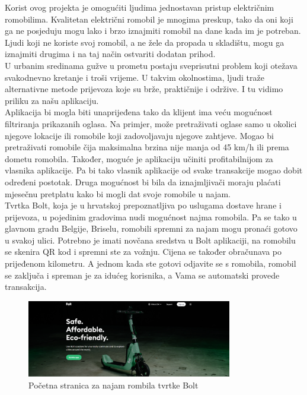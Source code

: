 		\indent Korist ovog projekta je omogućiti ljudima jednostavan pristup električnim romobilima. Kvalitetan električni romobil je mnogima preskup, tako da oni koji ga ne posjeduju mogu lako i brzo iznajmiti romobil na dane kada im je potreban. Ljudi koji ne koriste svoj romobil, a ne žele da propada u skladištu, mogu ga iznajmiti drugima i na taj način ostvariti dodatan prihod. \\
		\indent U urbanim sredinama gužve u prometu postaju sveprisutni problem koji otežava svakodnevno kretanje i troši vrijeme. U takvim okolnostima, ljudi traže alternativne metode prijevoza koje su brže, praktičnije i održive. I tu vidimo priliku za našu aplikaciju.\\
		
		\indent Aplikacija bi mogla biti unaprijeđena tako da klijent ima veću mogućnost filtriranja prikazanih oglasa. Na primjer, može pretraživati oglase samo u okolici njegove lokacije ili romobile koji zadovoljavaju njegove zahtjeve. Mogao bi pretraživati romobile čija maksimalna brzina nije manja od 45 km/h ili prema dometu romobila. Također, moguće je aplikaciju učiniti profitabilnijom za vlasnika aplikacije.
		Pa bi tako vlasnik aplikacije od svake transakcije mogao dobit određeni postotak. Druga mogućnost bi bila da iznajmljivači moraju plaćati mjesečnu pretplatu kako bi mogli dat svoje romobile u najam. \\
		
		\indent Tvrtka Bolt, koja je u hrvatskoj prepoznatljiva po uslugama dostave hrane i prijevoza, u pojedinim gradovima nudi mogućnost najma romobila. Pa se tako u glavnom gradu Belgije, Briselu, romobili spremni za najam mogu pronaći gotovo u svakoj ulici. Potrebno je imati novčana sredstva u Bolt aplikaciji, na romobilu se skenira QR kod i spremni ste za vožnju. Cijena se također obračunava po prijeđenom kilometru. A jednom kada ste gotovi odjavite se s romobila, romobil se zaključa i spreman je za idućeg korisnika, a Vama se 	automatski provede transakcija.
		
		\begin{figure}[h]
			\centering
			\includegraphics[width=0.8\textwidth]{slike/bolt-1.png}
			\caption{Početna stranica za najam rombila tvrtke Bolt}
			\label{fig:bolt-1}
		\end{figure}
		
